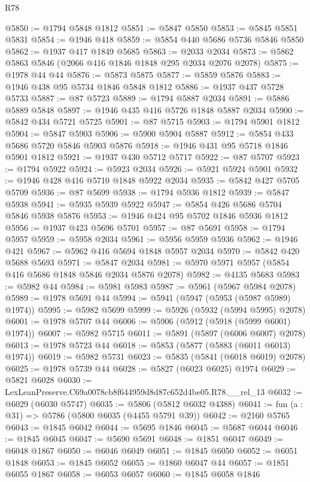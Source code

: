 \begin{lexlean}{R78}
\begin{coremodule}
@5850 := @1794 @5848 @1812
@5851 := @5847 @5850
@5853 := @5845 @5851 @5831
@5854 := @1946 @418
@5859 := @5854 @440 @5686 @5736 @5846 @5850
@5862 := @1937 @417 @1849 @5685
@5863 := @2033 @2034
@5873 := @5862 @5863 @5846 (@2066 @416 @1846 @1848 @295 @2034 @2076 @2078)
@5875 := @1978 @44 @44
@5876 := @5873 @5875
@5877 := @5859 @5876
@5883 := @1946 @438 @95 @5734 @1846 @5848 @1812
@5886 := @1937 @437 @5728 @5733
@5887 := @87 @5723
@5889 := @1794 @5887 @2034
@5891 := @5886 @5889 @5848
@5897 := @1946 @435 @416 @5726 @1848 @5887 @2034
@5900 := @5842 @434 @5721 @5725
@5901 := @87 @5715
@5903 := @1794 @5901 @1812
@5904 := @5847 @5903
@5906 := @5900 @5904 @5887
@5912 := @5854 @433 @5686 @5720 @5846 @5903 @5876
@5918 := @1946 @431 @95 @5718 @1846 @5901 @1812
@5921 := @1937 @430 @5712 @5717
@5922 := @87 @5707
@5923 := @1794 @5922
@5924 := @5923 @2034
@5926 := @5921 @5924 @5901
@5932 := @1946 @428 @416 @5710 @1848 @5922 @2034
@5935 := @5842 @427 @5705 @5709
@5936 := @87 @5699
@5938 := @1794 @5936 @1812
@5939 := @5847 @5938
@5941 := @5935 @5939 @5922
@5947 := @5854 @426 @5686 @5704 @5846 @5938 @5876
@5953 := @1946 @424 @95 @5702 @1846 @5936 @1812
@5956 := @1937 @423 @5696 @5701
@5957 := @87 @5691
@5958 := @1794 @5957
@5959 := @5958 @2034
@5961 := @5956 @5959 @5936
@5962 := @1946 @421
@5967 := @5962 @416 @5694 @1848 @5957 @2034
@5970 := @5842 @420 @5688 @5693
@5971 := @5847 @2034
@5981 := @5970 @5971 @5957 (@5854 @416 @5686 @1848 @5846 @2034 @5876 @2078)
@5982 := @4135 @5683
@5983 := @5982 @44
@5984 := @5981 @5983
@5987 := @5961 (@5967 @5984 @2078)
@5989 := @1978 @5691 @44
@5994 := @5941 (@5947 (@5953 (@5987 @5989) @1974))
@5995 := @5982 @5699
@5999 := @5926 (@5932 (@5994 @5995) @2078)
@6001 := @1978 @5707 @44
@6006 := @5906 (@5912 (@5918 (@5999 @6001) @1974))
@6007 := @5982 @5715
@6011 := @5891 (@5897 (@6006 @6007) @2078)
@6013 := @1978 @5723 @44
@6018 := @5853 (@5877 (@5883 (@6011 @6013) @1974))
@6019 := @5982 @5731
@6023 := @5835 (@5841 (@6018 @6019) @2078)
@6025 := @1978 @5739 @44
@6028 := @5827 (@6023 @6025) @1974
@6029 := @5821 @6028
@6030 := LexLeanPreserve.C69a0078cb8f644959d8d87c652d4be05.R78.__rel_13
@6032 := @6029 (@6030 @5747)
@6035 := @5806 (@5812 @6032 @4388)
@6041 := fun (a : @31) => @5786 (@5800 @6035 (@4455 @5791 @39))
@6042 := @2160 @5765
@6043 := @1845 @6042
@6044 := @5695 @1846
@6045 := @5687 @6044
@6046 := @1845 @6045
@6047 := @5690 @5691
@6048 := @1851 @6047
@6049 := @6048 @1867
@6050 := @6046 @6049
@6051 := @1845 @6050
@6052 := @6051 @1848
@6053 := @1845 @6052
@6055 := @1860 @6047 @44
@6057 := @1851 @6055 @1867
@6058 := @6053 @6057
@6060 := @1845 @6058 @1846

\end{coremodule}
\end{lexlean}
